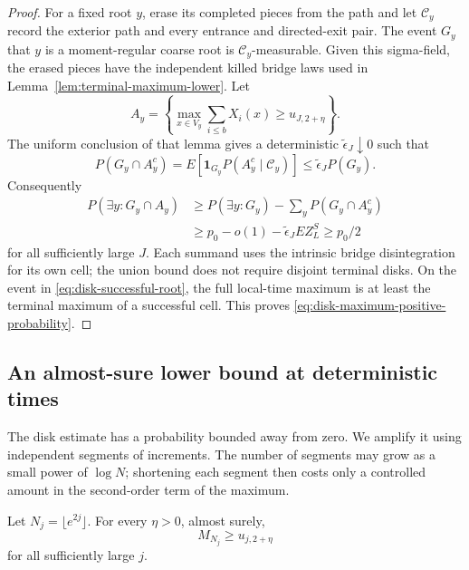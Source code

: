 \begin{proof}
For a fixed root $y$, erase its completed pieces from the path and
let $\mathcal C_y$ record the exterior path and every entrance and
directed-exit pair.  The event $G_y$ that $y$ is a moment-regular
coarse root is $\mathcal C_y$-measurable.  Given this sigma-field,
the erased pieces have the independent killed bridge laws used in
Lemma~\ref{lem:terminal-maximum-lower}.  Let
\[
 A_y=\left\{\max_{x\in V_y}\sum_{i\le b}X_i(x)
                       \ge u_{J,2+\eta}\right\}.
\]
The uniform conclusion of that lemma gives a deterministic
$\widetilde\epsilon_J\downarrow0$ such that
\begin{equation}
 P(G_y\cap A_y^c)
 =E[\mathbf1_{G_y}P(A_y^c\mid\mathcal C_y)]
 \le\widetilde\epsilon_JP(G_y).
 \tag{80}\label{eq:disk-fixed-root-failure}
\end{equation}
Consequently
\begin{equation}
 \begin{split}
 P(\exists y:G_y\cap A_y)
 &\ge P(\exists y:G_y)-\sum_yP(G_y\cap A_y^c)\\
 &\ge p_0-o(1)-\widetilde\epsilon_J EZ_L^S
 \ge p_0/2
 \end{split}
 \tag{81}\label{eq:disk-successful-root}
\end{equation}
for all sufficiently large $J$.  Each summand uses the intrinsic
bridge disintegration for its own cell; the union bound does not
require disjoint terminal disks.  On the event in
\eqref{eq:disk-successful-root}, the full local-time maximum is at
least the terminal maximum of a successful cell.  This proves
\eqref{eq:disk-maximum-positive-probability}.
\end{proof}

\subsection{An almost-sure lower bound at deterministic times}
\label{sec:deterministic-lower}

The disk estimate has a probability bounded away from zero.  We
amplify it using independent segments of increments.  The number of
segments may grow as a small power of $\log N$; shortening each
segment then costs only a controlled amount in the second-order
term of the maximum.

\begin{proposition}
\label{prop:deterministic-maximum-lower}
Let $N_j=\lfloor e^{2j}\rfloor$.  For every $\eta>0$, almost surely,
\[
 M_{N_j}\ge u_{j,2+\eta}
\]
for all sufficiently large $j$.
\end{proposition}


